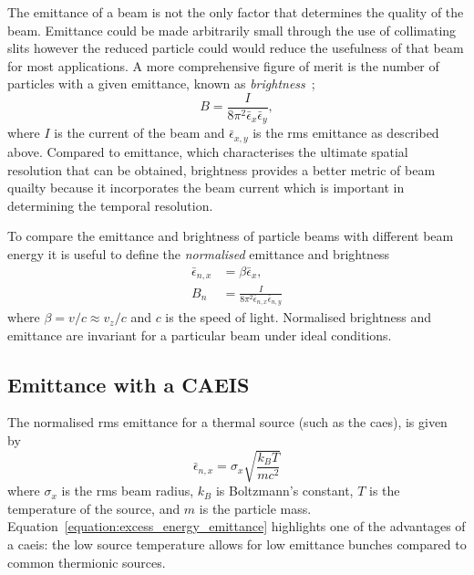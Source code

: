 The emittance of a beam is not the only factor that determines the quality of the beam.
Emittance could be made arbitrarily small through the use of collimating slits however the reduced particle could would reduce the usefulness of that beam for most applications.
A more comprehensive figure of merit is the number of particles with a given emittance, known as \emph{brightness}~\cite{reiser_theory_2008};
\begin{equation}
B = \frac{I}{8\pi^2\bar{\epsilon}_x\bar{\epsilon}_y},
\end{equation}
where $I$ is the current of the beam and $\bar{\epsilon}_{x,y}$ is the \gls{rms} emittance as described above.
Compared to emittance, which characterises the ultimate spatial resolution that can be obtained, brightness provides a better metric of beam quailty because it incorporates the beam current which is important in determining the temporal resolution.

To compare the emittance and brightness of particle beams with different beam energy it is useful to define the \emph{normalised} emittance and brightness
\begin{align}
\bar{\epsilon}_{n,x} &= \beta\bar{\epsilon}_x,\\
B_n &= \frac{I}{8\pi^2\bar{\epsilon}_{n,x}\bar{\epsilon}_{n,y}}
\end{align}
where $\beta=v/c\approx v_z/c$ and $c$ is the speed of light.
Normalised brightness and emittance are invariant for a particular beam under ideal conditions.


\subsection{Emittance with a CAEIS}
\label{section:excess_energy_emittance}

The normalised \gls{rms} emittance for a thermal source (such as the \gls{caes}), is given by~\cite{mcculloch_high-coherence_2013}
\begin{equation}\label{equation:excess_energy_emittance}
\bar{\epsilon}_{n,x} = \sigma_x \sqrt{\frac{k_B T}{m c^2}}
\end{equation}
where $\sigma_x$ is the \gls{rms} beam radius, $k_B$ is Boltzmann's constant, $T$ is the temperature of the source, and $m$ is the particle mass.
Equation~\ref{equation:excess_energy_emittance} highlights one of the advantages of a \gls{caeis}: the low source temperature allows for low emittance bunches compared to common thermionic sources.

